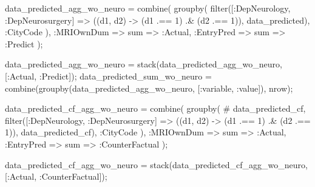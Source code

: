 \documentclass[
  letterpaper,
  DIV=11,
  numbers=noendperiod]{scrreprt}
\newenvironment{Shaded}{\begin{snugshade}}{\end{snugshade}}
\newcommand{\CommentTok}[1]{\textcolor[rgb]{0.37,0.37,0.37}{#1}}
\newcommand{\FloatTok}[1]{\textcolor[rgb]{0.68,0.00,0.00}{#1}}
\newcommand{\FunctionTok}[1]{\textcolor[rgb]{0.28,0.35,0.67}{#1}}
\newcommand{\NormalTok}[1]{\textcolor[rgb]{0.00,0.23,0.31}{#1}}
\newcommand{\OperatorTok}[1]{\textcolor[rgb]{0.37,0.37,0.37}{#1}}
\begin{document}
\begin{Shaded}
\begin{Highlighting}[]
\NormalTok{data\_predicted\_agg\_wo\_neuro }\OperatorTok{=} \FunctionTok{combine}\NormalTok{(}
    \FunctionTok{groupby}\NormalTok{(}
        \FunctionTok{filter}\NormalTok{([}\OperatorTok{:}\NormalTok{DepNeurology, }\OperatorTok{:}\NormalTok{DepNeurosurgery] }\OperatorTok{=\textgreater{}}\NormalTok{ ((d1, d2) }\OperatorTok{{-}\textgreater{}}\NormalTok{ (d1 }\OperatorTok{.==} \FloatTok{1}\NormalTok{) }\OperatorTok{.\&}\NormalTok{ (d2 }\OperatorTok{.==} \FloatTok{1}\NormalTok{)), data\_predicted),}
        \OperatorTok{:}\NormalTok{CityCode}
\NormalTok{        ),}
    \OperatorTok{:}\NormalTok{MRIOwnDum }\OperatorTok{=\textgreater{}}\NormalTok{ sum }\OperatorTok{=\textgreater{}} \OperatorTok{:}\NormalTok{Actual,}
    \OperatorTok{:}\NormalTok{EntryPred }\OperatorTok{=\textgreater{}}\NormalTok{ sum }\OperatorTok{=\textgreater{}} \OperatorTok{:}\NormalTok{Predict}
\NormalTok{);}

\NormalTok{data\_predicted\_agg\_wo\_neuro }\OperatorTok{=} \FunctionTok{stack}\NormalTok{(data\_predicted\_agg\_wo\_neuro, [}\OperatorTok{:}\NormalTok{Actual, }\OperatorTok{:}\NormalTok{Predict]);}
\NormalTok{data\_predicted\_sum\_wo\_neuro }\OperatorTok{=} \FunctionTok{combine}\NormalTok{(}\FunctionTok{groupby}\NormalTok{(data\_predicted\_agg\_wo\_neuro, [}\OperatorTok{:}\NormalTok{variable, }\OperatorTok{:}\NormalTok{value]), nrow);}

\NormalTok{data\_predicted\_cf\_agg\_wo\_neuro }\OperatorTok{=} \FunctionTok{combine}\NormalTok{(}
    \FunctionTok{groupby}\NormalTok{(}
        \CommentTok{\# data\_predicted\_cf, }
        \FunctionTok{filter}\NormalTok{([}\OperatorTok{:}\NormalTok{DepNeurology, }\OperatorTok{:}\NormalTok{DepNeurosurgery] }\OperatorTok{=\textgreater{}}\NormalTok{ ((d1, d2) }\OperatorTok{{-}\textgreater{}}\NormalTok{ (d1 }\OperatorTok{.==} \FloatTok{1}\NormalTok{) }\OperatorTok{.\&}\NormalTok{ (d2 }\OperatorTok{.==} \FloatTok{1}\NormalTok{)), data\_predicted\_cf),}
        \OperatorTok{:}\NormalTok{CityCode}
\NormalTok{        ),}
    \OperatorTok{:}\NormalTok{MRIOwnDum }\OperatorTok{=\textgreater{}}\NormalTok{ sum }\OperatorTok{=\textgreater{}} \OperatorTok{:}\NormalTok{Actual,}
    \OperatorTok{:}\NormalTok{EntryPred }\OperatorTok{=\textgreater{}}\NormalTok{ sum }\OperatorTok{=\textgreater{}} \OperatorTok{:}\NormalTok{CounterFactual}
\NormalTok{);}

\NormalTok{data\_predicted\_cf\_agg\_wo\_neuro }\OperatorTok{=} \FunctionTok{stack}\NormalTok{(data\_predicted\_cf\_agg\_wo\_neuro, [}\OperatorTok{:}\NormalTok{Actual, }\OperatorTok{:}\NormalTok{CounterFactual]);}


\end{Highlighting}
\end{Shaded}
\end{document}
